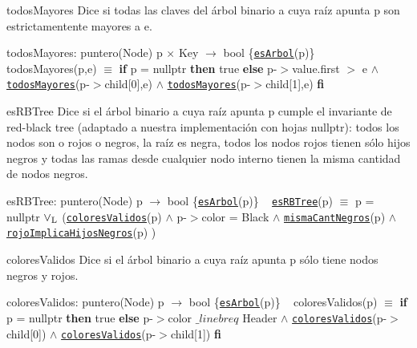 \begin{DoxyParagraph}{todos\+Mayores}
Dice si todas las claves del árbol binario a cuya raíz apunta p son estrictamentente mayores a e.

todos\+Mayores\+: puntero(\+Node) p $\times$ Key $\to$ bool \{\href{axiomas.html#esArbol}{\tt es\+Arbol}(p)\} ~\newline
todos\+Mayores(p,e) $\equiv$ {\bfseries if} p = nullptr {\bfseries then} true {\bfseries else} p-\/$>$value.\+first $>$ e $\land$ \href{axiomas.html#todosMayores}{\tt todos\+Mayores}(p-\/$>$child\mbox{[}0\mbox{]},e) $\land$ \href{axiomas.html#todosMayores}{\tt todos\+Mayores}(p-\/$>$child\mbox{[}1\mbox{]},e) {\bfseries fi} 


\end{DoxyParagraph}
\begin{DoxyParagraph}{es\+R\+B\+Tree}
Dice si el árbol binario a cuya raíz apunta p cumple el invariante de red-\/black tree (adaptado a nuestra implementación con hojas nullptr)\+: todos los nodos son o rojos o negros, la raíz es negra, todos los nodos rojos tienen sólo hijos negros y todas las ramas desde cualquier nodo interno tienen la misma cantidad de nodos negros.

es\+R\+B\+Tree\+: puntero(\+Node) p $\to$ bool \{\href{axiomas.html#esArbol}{\tt es\+Arbol}(p)\} ~\newline
\href{axiomas.html#esRBTree}{\tt es\+R\+B\+Tree}(p) $\equiv$ p = nullptr $\lor_{\rm L}$ (\href{axiomas.html#coloresValidos}{\tt colores\+Validos}(p) $\land$ p-\/$>$color = Black $\land$ \href{axiomas.html#mismaCantNegros}{\tt misma\+Cant\+Negros}(p) $\land$ \href{axiomas.html#rojoImplicaHijosNegros}{\tt rojo\+Implica\+Hijos\+Negros}(p) )


\end{DoxyParagraph}
\begin{DoxyParagraph}{colores\+Validos}
Dice si el árbol binario a cuya raíz apunta p sólo tiene nodos negros y rojos.

colores\+Validos\+: puntero(\+Node) p $\to$ bool \{\href{axiomas.html#esArbol}{\tt es\+Arbol}(p)\} ~\newline
colores\+Validos(p) $\equiv$ {\bfseries if} p = nullptr {\bfseries then} true {\bfseries else} p-\/$>$color $\_linebr eq$ Header $\land$ \href{axiomas.html#coloresValidos}{\tt colores\+Validos}(p-\/$>$child\mbox{[}0\mbox{]}) $\land$ \href{axiomas.html#coloresValidos}{\tt colores\+Validos}(p-\/$>$child\mbox{[}1\mbox{]}) {\bfseries fi} 


\end{DoxyParagraph}
